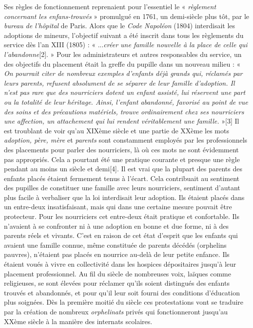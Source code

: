  Ses règles de fonctionnement reprenaient pour l'essentiel le « \emph{ règlement concernant les enfans-trouvés} » promulgué en 1761, un demi-siècle plus tôt, par le \emph{bureau de l'hôpital} de Paris. Alors que le \emph{Code Napoléon} (1804) interdisait les adoptions de mineurs, l'objectif suivant a été inscrit dans tous les règlements du service dès l'an XIII (1805) : « ...\emph{créer une famille nouvelle à la place de celle qui l'abandonne}[2]. » Pour les administrateurs et autres responsables du service, un des objectifs du placement était la greffe du pupille dans un nouveau milieu : « \emph{On pourrait citer de nombreux exemples d'enfants déjà grands qui, réclamés par leurs parents, refusent absolument de se séparer de leur famille d'adoption. Il n'est pas rare que des nourriciers dotent un enfant assisté, lui réservent une part ou la totalité de leur héritage. Ainsi, l'enfant abandonné, favorisé au point de vue des soins et des précautions matériels, trouve ordinairement chez ses nourriciers une affection, un attachement qui lui rendent véritablement une famille.} »[3] 
 Il est troublant de voir qu'au XIXème siècle et une partie de XXème les mots \emph{adoption, père, mère} et \emph{parents} sont constamment employés par les professionnels des placements pour parler des nourriciers, là où ces mots ne sont évidemment pas appropriés. Cela a pourtant été une pratique courante et presque une règle pendant au moins un siècle et demi[4]. Il est vrai que la plupart des parents des enfants placés étaient fermement tenus à l'écart. Cela contribuait au sentiment des pupilles de constituer une famille avec leurs nourriciers, sentiment d'autant plus facile à verbaliser que la loi interdisait leur adoption. Ils étaient placés dans un entre-deux insatisfaisant, mais qui dans une certaine mesure pouvait être protecteur. Pour les nourriciers cet entre-deux était pratique et confortable. Ils n'avaient à se confronter ni à une adoption en bonne et due forme, ni à des parents réels et vivants. 
 C'est en raison de cet état d'esprit que les enfants qui avaient une famille connue, même constituée de parents décédés (orphelins pauvres), n'étaient pas placés en nourrice au-delà de leur petite enfance. Ils étaient voués à vivre en collectivité dans les hospices dépositaires jusqu'à leur placement professionnel. Au fil du siècle de nombreuses voix, laïques comme religieuses, se sont élevées pour réclamer qu'ils soient distingués des enfants trouvés et abandonnés, et pour qu'il leur soit fourni des conditions d'éducation plus soignées. Dès la première moitié du siècle ces protestations vont se traduire par la création de nombreux \emph{orphelinats} privés qui fonctionneront jusqu'au XXème siècle à la manière des internats scolaires. 
